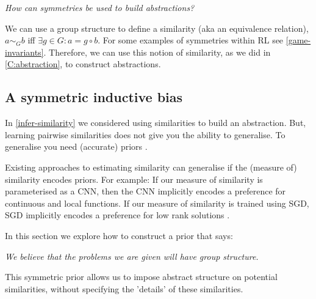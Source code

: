 \begin{displayquote}
\textsl{How can symmetries be used to build abstractions?}
\end{displayquote}

We can use a group structure to define a similarity (aka an equivalence relation),
$a \sim_G b$ iff $\exists g \in G: a = g \circ b$. For some examples of symmetries within RL see \ref{game-invariants}.
Therefore, we can use this notion of similarity, as we did in \ref{C:abstraction}, to construct abstractions.


\subsection{A symmetric inductive bias}


In \ref{infer-similarity} we considered using similarities
to build an abstraction. But, learning pairwise similarities does not give
you the ability to generalise\footnotemark. To generalise you need (accurate) priors \cite{Wolpert1996}.


Existing approaches to estimating similarity can generalise if the (measure of) similarity encodes priors.
For example:
If our measure of similarity is parameterised as a CNN, then the CNN implicitly encodes a preference for continuous and local functions\cite{Yann1995}.
If our measure of similarity is trained using SGD, SGD implicitly encodes a preference for low rank solutions \cite{Gunasekar2017}.

In this section we explore how to construct a prior that says:

\begin{displayquote}
	\textsl{We believe that the problems we are given will have group structure.}
\end{displayquote}

This symmetric prior allows us to impose abstract structure on potential similarities, without specifying
the 'details' of these similarities.

%
%
%

